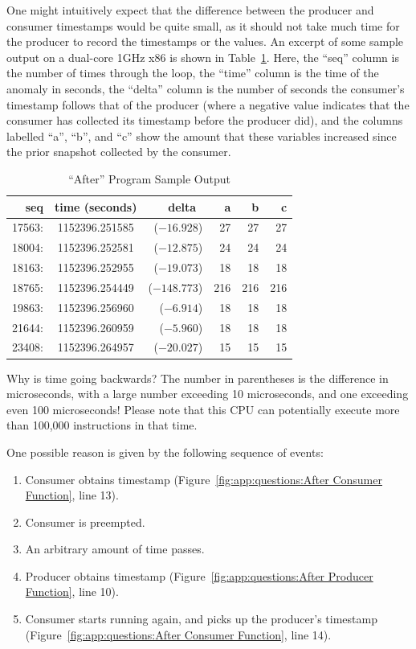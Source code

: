 One might intuitively expect that the difference between the producer
and consumer timestamps would be quite small, as it should not take
much time for the producer to record the timestamps or the values.
An excerpt of some sample output on a dual-core 1GHz x86 is shown in
Table~\ref{tab:app:questions:After Program Sample Output}.
Here, the ``seq'' column is the number of times through the loop,
the ``time'' column is the time of the anomaly in seconds, the ``delta''
column is the number of seconds the consumer's timestamp follows that
of the producer (where a negative value indicates that the consumer
has collected its timestamp before the producer did), and the
columns labelled ``a'', ``b'', and ``c'' show the amount that these
variables increased since the prior snapshot collected by the consumer.

\begin{table}[htbp]
\centering
\scriptsize
\begin{tabular}{rcrrrr}
seq    & time (seconds) & delta~    &  a &  b &  c \\
\hline
17563: & 1152396.251585 & ($-16.928$) & 27 & 27 & 27 \\
18004: & 1152396.252581 & ($-12.875$) & 24 & 24 & 24 \\
18163: & 1152396.252955 & ($-19.073$) & 18 & 18 & 18 \\
18765: & 1152396.254449 & ($-148.773$) & 216 & 216 & 216 \\
19863: & 1152396.256960 & ($-6.914$) & 18 & 18 & 18 \\
21644: & 1152396.260959 & ($-5.960$) & 18 & 18 & 18 \\
23408: & 1152396.264957 & ($-20.027$) & 15 & 15 & 15 \\
\end{tabular}
\caption{``After'' Program Sample Output}
\label{tab:app:questions:After Program Sample Output}
\end{table}

Why is time going backwards?
The number in parentheses is the difference in microseconds, with
a large number exceeding 10 microseconds, and one exceeding even
100 microseconds!
Please note that this CPU can potentially execute more than 100,000
instructions in that time.

One possible reason is given by the following sequence of events:
\begin{enumerate}
\item	Consumer obtains timestamp
	(Figure~\ref{fig:app:questions:After Consumer Function}, line 13).
\item	Consumer is preempted.
\item	An arbitrary amount of time passes.
\item	Producer obtains timestamp
	(Figure~\ref{fig:app:questions:After Producer Function}, line 10).
\item	Consumer starts running again, and picks up the producer's
	timestamp
	(Figure~\ref{fig:app:questions:After Consumer Function}, line 14).
\end{enumerate}

